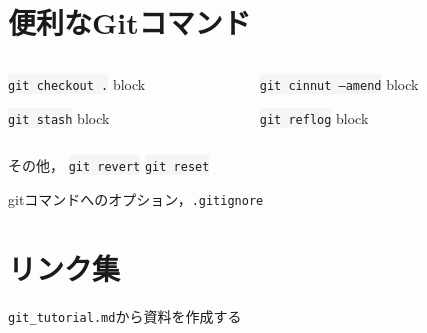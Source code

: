 \documentclass[12pt,dvipdfmx,svgnames,uplatex,aspectratio=169]{beamer}
\newcommand{\git}[1]{{\colorbox{WhiteSmoke}{\texttt{#1}}}}  %
\begin{document}
\section{便利なGitコマンド}
\begin{frame}{\insertsection}
  \begin{columns}[T] %
    \begin{column}{0.5\textwidth}
      \begin{block}{\git{git checkout .}}
        block
      \end{block}
      \begin{block}{\git{git stash}}
        block
      \end{block}
    \end{column}
    \begin{column}{0.5\textwidth}
      \begin{block}{\git{git cinnut --amend}}
        block
      \end{block}
      \begin{block}{\git{git reflog}}
        block
      \end{block}
    \end{column}
  \end{columns}
  その他， \git{git revert} \git{git reset}

  gitコマンドへのオプション，\texttt{.gitignore}
\end{frame}

\section{リンク集}
\begin{frame}{\insertsection}
  \texttt{git\_tutorial.md}から資料を作成する
\end{frame}
\end{document}
